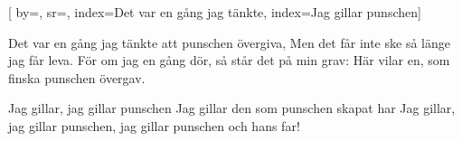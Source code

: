 

[ 		%
	by={},					%
	sr={},					%
	index={Det var en gång jag tänkte}, %
	index={Jag gillar punschen}]						%

\beginverse*						%
Det var en gång jag tänkte
att punschen övergiva,
Men det får inte ske
så länge jag får leva.
För om jag en gång dör,
så står det på min grav:
Här vilar en, som finska punschen övergav.
\endverse							%

\beginchorus
Jag gillar, jag gillar punschen
Jag gillar den som punschen skapat har
Jag gillar, jag gillar punschen,
jag gillar punschen och hans far!
\endchorus
\endsong							%